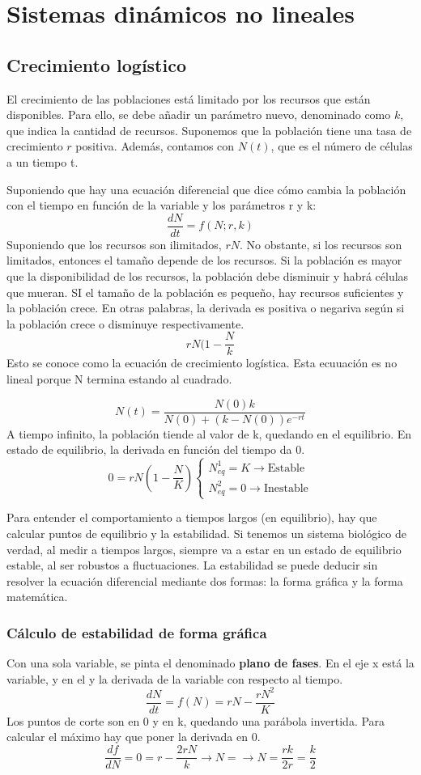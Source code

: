 \chapter{Sistemas dinámicos no lineales}
\section{Crecimiento logístico}
El crecimiento de las poblaciones está limitado por los recursos que están disponibles. Para ello, se debe añadir un parámetro nuevo, denominado como $k$, que indica la cantidad de recursos. Suponemos que la población tiene una tasa de crecimiento $r$ positiva. Además, contamos con $N(t)$, que es el número de células a un tiempo t. 

Suponiendo que hay una ecuación diferencial que dice cómo cambia la población con el tiempo en función de la variable y los parámetros r y k:
$$\frac{dN}{dt} = f(N; r, k)$$
Suponiendo que los recursos son ilimitados, $r N$. No obstante, si los recursos son limitados, entonces el tamaño depende de los recursos. Si la población es mayor que la disponibilidad de los recursos, la población debe disminuir y habrá células que mueran. SI el tamaño de la población es pequeño, hay recursos suficientes y la población crece. En otras palabras, la derivada es positiva o negariva según si la población crece o disminuye respectivamente. 
$$r N (1 - \frac{N}{k}$$
Esto se conoce como la ecuación de crecimiento logística. Esta ecuuación es no lineal porque N termina estando al cuadrado. 

$$N(t) = \frac{N(0) k}{N(0) + (k - N(0))e^{-rt}}$$
A tiempo infinito, la población tiende al valor de k, quedando en el equilibrio.
En estado de equilibrio, la derivada en función del tiempo da 0. 
$$0 = r N (1 - \frac{N}{K}) \begin{cases} 
N^1_{eq} = K \rightarrow \text{Estable} \\
N^2_{eq} = 0 \rightarrow \text{Inestable}
\end{cases}
$$

Para entender el comportamiento a tiempos largos (en equilibrio), hay que calcular puntos de equilibrio y la estabilidad. Si tenemos un sistema biológico de verdad, al medir a tiempos largos, siempre va a estar en un estado de equilibrio estable, al ser robustos a fluctuaciones. La estabilidad se puede deducir sin resolver la ecuación diferencial mediante dos formas: la forma gráfica y la forma matemática. 

\subsection{Cálculo de estabilidad de forma gráfica}
Con una sola variable, se pinta el denominado \textbf{plano de fases}. En el eje x está la variable, y en el y la derivada de la variable con respecto al tiempo. 
$$\frac{dN}{dt} = f(N) = rN - \frac{rN^2}{K}$$ 
Los puntos de corte son en 0 y en k, quedando una parábola invertida. Para calcular el máximo hay que poner la derivada en 0.
$$\frac{df}{dN} = 0 = r - \frac{2rN}{k} \rightarrow N = \rightarrow N = \frac{rk}{2r} = \frac{k}{2}$$

